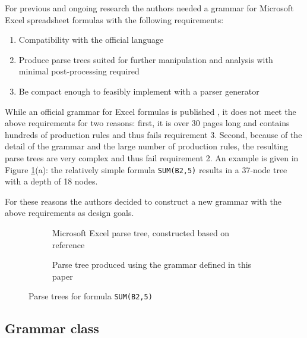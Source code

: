 \documentclass[conference]{IEEEtran}
\begin{document}
For previous and ongoing research the authors needed a grammar for Microsoft Excel spreadsheet formulas with the following requirements:

\label{sec:designgoals}
\begin{enumerate}
\item Compatibility with the official language
\item Produce parse trees suited for further manipulation and analysis with minimal post-processing required
\item Be compact enough to feasibly implement with a parser generator
\end{enumerate}

While an official grammar for Excel formulas is published \cite{ExcelOfficialGrammar}, it does not meet the above requirements for two reasons: first, it is over 30 pages long and contains hundreds of production rules and thus fails requirement 3.
Second, because of the detail of the grammar and the large number of production rules, the resulting parse trees are very complex and thus fail requirement 2.
An example is given in Figure \ref{figure:parsetrees}(a): the relatively simple formula \texttt{SUM(B2,5)} results in a 37-node tree with a depth of 18 nodes.

For these reasons the authors decided to construct a new grammar with the above requirements as design goals.

\begin{figure}
	\centering
	\begin{subfigure}[b]{0.3\textwidth}
		\hspace{-2em}
		\scalebox{.7}{
			
		}
		\caption{Microsoft Excel parse tree, constructed based on reference \cite{ExcelOfficialGrammar}}
	\end{subfigure}
	\begin{subfigure}[b]{0.3\textwidth}
		\vspace{1em}
		\hspace{-0.5em}
		\scalebox{.7}{
			
		}
		\caption{Parse tree produced using the grammar defined in this paper}
	\end{subfigure}
	\caption{Parse trees for formula \texttt{SUM(B2,5)}}
	\label{figure:parsetrees}
\end{figure}

\subsection{Grammar class}
\end{document}
